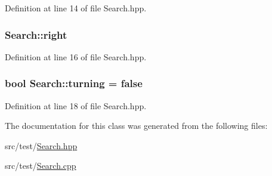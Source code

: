 Definition at line 14 of file Search.\-hpp.

\hypertarget{classSearch_a7f0e23cc5c8aa635fbe7f5b4c8e30eb0}{
\subsubsection[{right}]{ Search\-::right\hspace{0.3cm}{\ttfamily [private]}}}\label{classSearch_a7f0e23cc5c8aa635fbe7f5b4c8e30eb0}


Definition at line 16 of file Search.\-hpp.

\hypertarget{classSearch_aef5f5e911426d02067e2ac01e5549f1e}{
\subsubsection[{turning}]{\setlength{\rightskip}{0pt plus 5cm}bool Search\-::turning = false\hspace{0.3cm}{\ttfamily [private]}}}\label{classSearch_aef5f5e911426d02067e2ac01e5549f1e}


Definition at line 18 of file Search.\-hpp.



The documentation for this class was generated from the following files\-:\begin{DoxyCompactItemize}
\item 
src/test/\hyperlink{Search_8hpp}{Search.\-hpp}\item 
src/test/\hyperlink{Search_8cpp}{Search.\-cpp}\end{DoxyCompactItemize}
